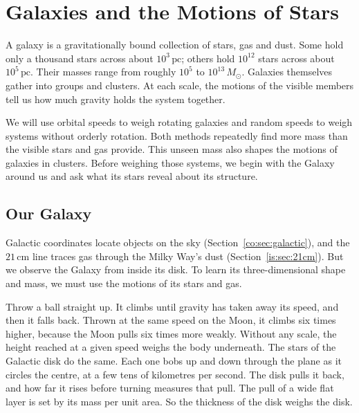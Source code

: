 \chapter{Galaxies and the Motions of Stars}
\label{ch:galaxies}








A galaxy is a gravitationally bound collection of stars, gas and dust. Some hold only a thousand stars across about $10^3\,\mathrm{pc}$; others hold $10^{12}$ stars across about $10^5\,\mathrm{pc}$. Their masses range from roughly $10^5$ to $10^{13}\,M_\odot$. Galaxies themselves gather into groups and clusters. At each scale, the motions of the visible members tell us how much gravity holds the system together.

We will use orbital speeds to weigh rotating galaxies and random speeds to weigh systems without orderly rotation. Both methods repeatedly find more mass than the visible stars and gas provide. This unseen mass also shapes the motions of galaxies in clusters. Before weighing those systems, we begin with the Galaxy around us and ask what its stars reveal about its structure.

\section{Our Galaxy}
\label{ga:sec:galaxy}

Galactic coordinates locate objects on the sky (Section~\ref{co:sec:galactic}), and the $21\,\mathrm{cm}$ line traces gas through the Milky Way's dust (Section~\ref{is:sec:21cm}). But we observe the Galaxy from inside its disk. To learn its three-dimensional shape and mass, we must use the motions of its stars and gas.

Throw a ball straight up. It climbs until gravity has taken away its speed, and then it falls back. Thrown at the same speed on the Moon, it climbs six times higher, because the Moon pulls six times more weakly. Without any scale, the height reached at a given speed weighs the body underneath. The stars of the Galactic disk do the same. Each one bobs up and down through the plane as it circles the centre, at a few tens of kilometres per second. The disk pulls it back, and how far it rises before turning measures that pull. The pull of a wide flat layer is set by its mass per unit area. So the thickness of the disk weighs the disk.

